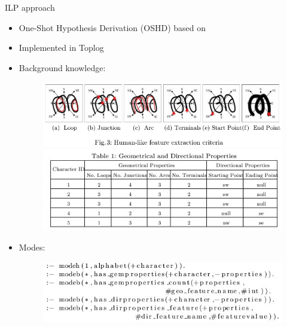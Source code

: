 \begin{frame}{ILP approach}
\begin{itemize}
    \item One-Shot Hypothesis Derivation (OSHD) based on \item Implemented in Toplog
    \item Background knowledge:
    \begin{figure}
        \centering
        \includegraphics[scale=0.4]{images/ilpfeatureextraction.jpg}
        \includegraphics[scale=0.4]{images/geomtable.jpg}
    \end{figure}    
    \item Modes:
    \begin{figure}
        \centering
        \includegraphics[scale=0.4]{images/modes.jpg}
    \end{figure}
\end{itemize}
\end{frame}

